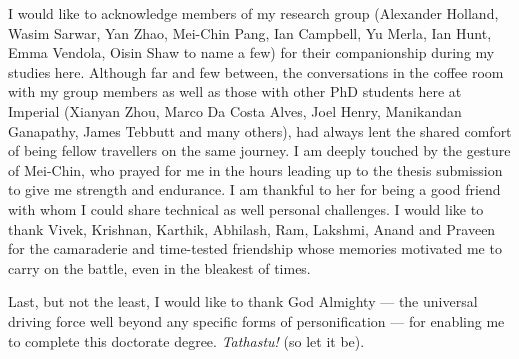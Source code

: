 \addlines[2]

I would like to acknowledge members of my research group (Alexander Holland,
Wasim Sarwar, Yan Zhao, Mei-Chin Pang, Ian Campbell, Yu Merla, Ian Hunt, Emma
Vendola, Oisin Shaw to name a few) for their companionship during my studies
here. Although far and few between, the conversations in the coffee room with my
group members as well as those with other PhD students here at Imperial (Xianyan
Zhou, Marco Da Costa Alves, Joel Henry, Manikandan Ganapathy, James Tebbutt and
many others), had always lent the shared comfort of being fellow travellers on
the same journey. I am deeply touched by the gesture of Mei-Chin, who prayed for
me  in the hours leading up to the thesis submission to give me strength and
endurance. I am thankful to her for being a good friend with whom I could share
technical as well personal challenges. I would like to thank Vivek, Krishnan,
Karthik, Abhilash, Ram, Lakshmi, Anand and Praveen for the camaraderie and
time-tested friendship whose memories motivated me to carry on the  battle, even
in the bleakest of times.

Last, but not the least, I would like to thank God Almighty --- the universal
driving force well beyond any specific forms of personification --- for enabling
me to complete this doctorate degree. \emph{Tathastu!} (so let it be).

